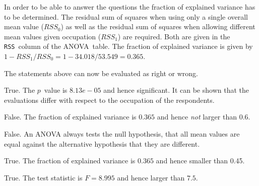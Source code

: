 \begin{solution}
In order to be able to answer the questions the fraction of
explained variance has to be determined. The residual sum of squares
when using only a single overall mean value ($\mathit{RSS}_0$) as
well as the residual sum of squares when allowing different mean
values given occupation ($\mathit{RSS}_1$) are required. Both are
given in the \texttt{RSS}~column of the ANOVA~table.  The
fraction of explained variance is given by $1 -
\mathit{RSS}_1/\mathit{RSS}_0 = 1 - 34.018/53.549 =
0.365$.  

The statements above can now be evaluated as right or wrong.

\begin{answerlist}
  \item True. The $p$~value is $ 8.13e-05 $ and hence  significant. It can   be shown that the evaluations differ with respect to the occupation of the respondents.
  \item False. The fraction of explained variance is $0.365$ and hence \textit{not} larger than 0.6.
  \item False. An ANOVA always tests the null hypothesis, that all mean values are equal against the alternative hypothesis that they are different.
  \item True. The fraction of explained variance is $0.365$ and hence  smaller than 0.45.
  \item True. The test statistic is $F = 8.995$ and hence  larger than $7.5$.
\end{answerlist}
\end{solution}


